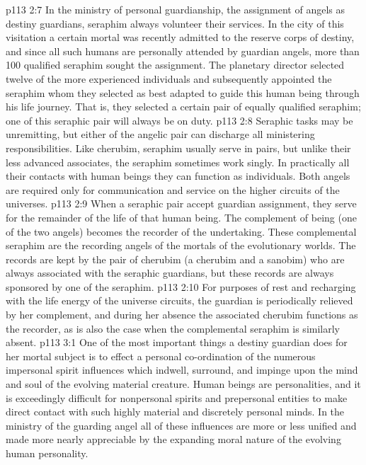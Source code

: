\vs p113 2:7 \pc In the ministry of personal guardianship, the assignment of angels as destiny guardians, seraphim always volunteer their services. In the city of this visitation a certain mortal was recently admitted to the reserve corps of destiny, and since all such humans are personally attended by guardian angels, more than 100 qualified seraphim sought the assignment. The planetary director selected twelve of the more experienced individuals and subsequently appointed the seraphim whom they selected as best adapted to guide this human being through his life journey. That is, they selected a certain pair of equally qualified seraphim; one of this seraphic pair will always be on duty.
\vs p113 2:8 Seraphic tasks may be unremitting, but either of the angelic pair can discharge all ministering responsibilities. Like cherubim, seraphim usually serve in pairs, but unlike their less advanced associates, the seraphim sometimes work singly. In practically all their contacts with human beings they can function as individuals. Both angels are required only for communication and service on the higher circuits of the universes.
\vs p113 2:9 When a seraphic pair accept guardian assignment, they serve for the remainder of the life of that human being. The complement of being (one of the two angels) becomes the recorder of the undertaking. These complemental seraphim are the recording angels of the mortals of the evolutionary worlds. The records are kept by the pair of cherubim (a cherubim and a sanobim) who are always associated with the seraphic guardians, but these records are always sponsored by one of the seraphim.
\vs p113 2:10 For purposes of rest and recharging with the life energy of the universe circuits, the guardian is periodically relieved by her complement, and during her absence the associated cherubim functions as the recorder, as is also the case when the complemental seraphim is similarly absent.
\vs p113 3:1 One of the most important things a destiny guardian does for her mortal subject is to effect a personal co\hyp{}ordination of the numerous impersonal spirit influences which indwell, surround, and impinge upon the mind and soul of the evolving material creature. Human beings are personalities, and it is exceedingly difficult for nonpersonal spirits and prepersonal entities to make direct contact with such highly material and discretely personal minds. In the ministry of the guarding angel all of these influences are more or less unified and made more nearly appreciable by the expanding moral nature of the evolving human personality.
